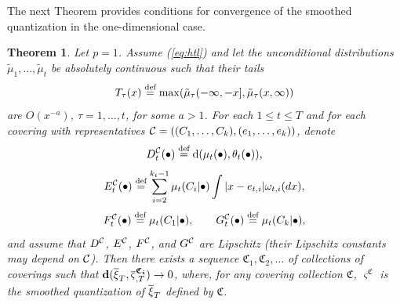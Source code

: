 \documentclass{article}              %
\newtheorem{theorem}{Theorem}
\begin{document}
\noindent The next Theorem provides conditions for convergence of the smoothed quantization
in the one-dimensional case.
\begin{theorem}
\label{thm:conv}Let $p=1$. Assume (\ref{eq:htl}) and let the unconditional distributions  $\tilde{\mu}_{1},\dots,\tilde{\mu}_{t}$
be absolutely continuous such that their tails $$T_\tau(x) \stackrel{\text{\rm def}}{=} \max(\tilde \mu_\tau(-\infty,-x],\tilde \mu_\tau(x,\infty))$$ are $O(x^{-a})$, $\tau=1,\dots,t$,
for some $a>1$. For each $1\leq t\leq T$ and for each covering with representatives
$\mathcal{C}=((C_{1},\dots,C_{k}),(e_{1},\dots,e_{k}))$, denote
\begin{equation}
D_{t}^{\mathcal{C}}(\bullet)\stackrel{\text{\rm def}}{=}\mathrm{d}(\mu_{t}(\bullet),\theta_{t}(\bullet)),\label{eq:firstlip}
\end{equation}
\begin{equation}
E_{t}^{\mathcal{C}}(\bullet)\stackrel{\text{\rm def}}{=}\sum_{i=2}^{k_{t}-1}\mu_{t}(C_{i}|\bullet)\int|x-e_{t,i}|\omega_{t,i}(dx),\label{eq:seclip}
\end{equation}
\begin{equation}
F_{t}^{\mathcal{C}}(\bullet)\stackrel{\text{\rm def}}{=}\mu_{t}(C_{1}|\bullet),\qquad G_{t}^{\mathcal{C}}(\bullet)\stackrel{\text{\rm def}}{=}\mu_{t}(C_{k}|\bullet),\label{eq:thirdlip}
\end{equation}
and assume that $D^{\mathcal{C}}$, $E^{\mathcal{C}}$, $F^{\mathcal{C}}$, and $G^{\mathcal{C}}$ are Lipschitz (their Lipschitz constants may depend on $\mathcal{C}$). Then there
exists a sequence $\mathfrak{C}_{1},\mathfrak{C}_{2},\dots$ of collections
of coverings such that $\mathbf{d}(\overline{\xi}_{T},\overline{\varsigma}_{,T}^{\boldsymbol{\mathfrak{C}_{i}}})\rightarrow0$,
where, for any covering collection $\mathfrak{C}$, $\varsigma^{\mathfrak{C}}$
is the smoothed quantization of $\overline{\xi}_{T}$ defined by $\mathfrak{C}$.
\end{theorem}
\end{document}
